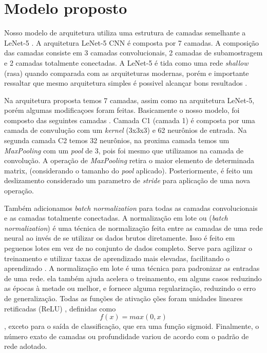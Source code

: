 \documentclass[openright]{UFRGS} %
\begin{document}
\section{Modelo proposto}

Nosso modelo de arquitetura utiliza uma estrutura de camadas  semelhante
a LeNet-5 \cite{lecun2015lenet}. A arquitetura LeNet-5 CNN é composta por 7 camadas. A composição das camadas consiste em 3 camadas convolucionais, 2 camadas de subamostragem e 2 camadas totalmente conectadas.
 A LeNet-5 é tida como uma rede \textit{shallow} (rasa) quando comparada com as arquiteturas  modernas, porém e importante ressaltar que mesmo arquitetura simples é possivel alcançar bons resultados \cite{lecun2015lenet}.

Na arquitetura proposta temos 7 camadas, assim como na arquitetura LeNet-5, porém algumas modificaçoes foram feitas. Basicamente o nosso modelo, foi composto das seguintes camadas
. Camada C1 (camada 1)  é composta por uma camada de convulução com um \textit{kernel} (3x3x3) e 62 neurônios de entrada. Na segunda camada C2 temos
32 neurônios, na proxima camada temos um \textit{MaxPooling} com um \textit{pool} de 3, pois foi mesmo que utilizamos na camada de convolução.
A operação de \textit{MaxPooling} retira o maior elemento de determinada matrix, (considerando o tamanho do \textit{pool} aplicado). Posteriormente, é feito um deslizamento considerado um parametro de \textit{stride} para aplicação de uma nova operação.


Também adicionamos \textit{batch
normalization}  para todas as camadas convolucionais e  as camadas totalmente conectadas. A normalização em lote ou  (\textit{batch
normalization})
 é uma técnica de normalização feita entre as camadas de uma rede neural  ao invés de se utilizar os dados brutos  diretamente. Isso é feito em peguenos lotes em vez de no conjunto de dados completo. Serve para agilizar o treinamento e 
utilizar taxas de aprendizado mais elevadas, facilitando o aprendizado \cite{ioffe2015batch}. A normalização em lote é uma técnica para padronizar as entradas de uma rede.
ela também ajuda acelera o treinamento, em alguns casos reduzindo as épocas à metade ou melhor, e fornece alguma regularização, reduzindo o erro de generalização. Todas as funções de ativação
ções foram unidades lineares retificadas (ReLU) , definidas como  $$ f (x) = max (0, x)  $$ , exceto para o
saída de classificação, que era uma função sigmoid. Finalmente, o número exato de camadas
ou profundidade variou de acordo com o padrão de rede adotado.
\end{document}
